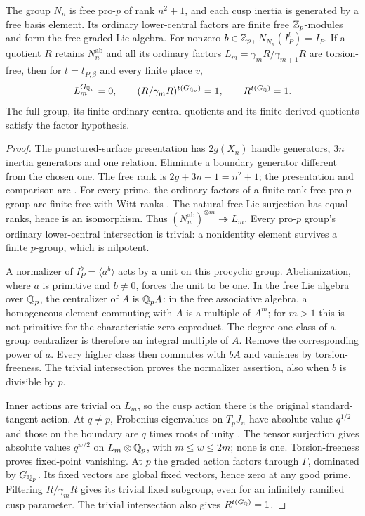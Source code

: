 \begin{lemma}
\label{lem:regular-group-fixed-points}
The group $N_n$ is free pro-$p$ of rank $n^2+1$, and each cusp
inertia is generated by a free basis element. Its ordinary
lower-central factors are finite free $\mathbb Z_p$-modules and form
the free graded Lie algebra. For nonzero $b\in\mathbb Z_p$,
$N_{N_n}(I_P^b)=I_P$.
If a quotient $R$ retains $N_n^{\mathrm{ab}}$ and all its ordinary
factors $L_m=\gamma_mR/\gamma_{m+1}R$ are torsion-free, then for
$t=t_{P,\beta}$ and every finite place $v$,
\[
 L_m^{G_{\mathbb Q_v}}=0,\qquad
 (R/\gamma_mR)^{t(G_{\mathbb Q_v})}=1,\qquad R^{t(G_\mathbb Q)}=1.
\]
The full group, its finite ordinary-central quotients and its
finite-derived quotients satisfy the factor hypothesis.
\end{lemma}
\begin{proof}
The punctured-surface presentation has $2g(X_n)$ handle generators,
$3n$ inertia generators and one relation. Eliminate a boundary
generator different from the chosen one. The free rank is
$2g+3n-1=n^2+1$; the presentation and comparison are
\citet[Expos\'e~XIII, Corollary~2.12, pp.~290--291;
Expos\'e~XII, Theorem~5.1]{SGA1}.
For every prime, the ordinary factors of a finite-rank free
pro-$p$ group are finite free with Witt ranks
\citep[\S3.5, p.~71, after Theorem~3.5.1]{LubotzkySegal2002}.
The natural free-Lie surjection has equal ranks, hence is an
isomorphism. Thus $(N_n^{\mathrm{ab}})^{\otimes m}\twoheadrightarrow L_m$.
Every pro-$p$ group's ordinary lower-central intersection is
trivial: a nonidentity element survives a finite $p$-group,
which is nilpotent.

A normalizer of $I_P^b=\langle a^b\rangle$ acts by a unit on this
procyclic group. Abelianization, where $a$ is primitive and $b\ne0$,
forces the unit to be one. In the free Lie algebra over $\mathbb Q_p$,
the centralizer of $A$ is $\mathbb Q_pA$: in the free associative algebra,
a homogeneous element commuting with $A$ is a multiple of $A^m$;
for $m>1$ this is not primitive for the characteristic-zero
coproduct. The degree-one class of a group centralizer is therefore
an integral multiple of $A$. Remove the corresponding power of
$a$. Every higher class then commutes with $bA$ and vanishes by
torsion-freeness. The trivial intersection proves the normalizer
assertion, also when $b$ is divisible by $p$.

Inner actions are trivial on $L_m$, so the cusp action there is
the original standard-tangent action. At $q\ne p$, Frobenius
eigenvalues on $T_pJ_n$ have absolute value $q^{1/2}$ and those
on the boundary are $q$ times roots of unity
\citep[Theorem~(1.6), p.~276]{Deligne1974}.
The tensor surjection gives absolute values $q^{w/2}$ on
$L_m\otimes\mathbb Q_p$, with $m\le w\le2m$; none is one.
Torsion-freeness proves fixed-point vanishing. At $p$ the graded
action factors through $\Gamma$, dominated by $G_{\mathbb Q_p}$.
Its fixed vectors are global fixed vectors, hence zero at any
good prime. Filtering $R/\gamma_mR$ gives its trivial fixed
subgroup, even for an infinitely ramified cusp parameter.
The trivial intersection also gives $R^{t(G_\mathbb Q)}=1$.


\end{proof}
